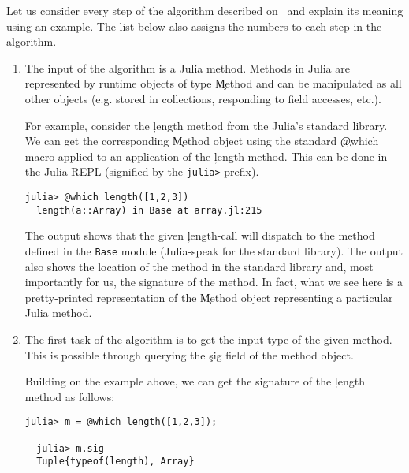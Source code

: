 Let us consider every step of the algorithm described
on~ and explain its meaning using an example.
The list below also assigns the numbers to each step in the algorithm.
\begin{enumerate}

  \item The input of the algorithm is a Julia method. Methods in Julia are
  represented by runtime objects of type \c{Method} and can be manipulated as
  all other objects (e.g. stored in collections, responding to field accesses, etc.).

  For example, consider the \c{length} method from the Julia's standard library. We can
  get the corresponding \c{Method} object using the standard \c{@which} macro
  applied to an application of the \c{length} method. This can be done in the
  Julia REPL (signified by the \texttt{julia>} prefix).

\begin{minipage}{.92\textwidth}
\begin{lstlisting}[style=jterm]
  julia> @which length([1,2,3])
  length(a::Array) in Base at array.jl:215
\end{lstlisting}
\end{minipage}

  The output shows that the given \c{length}-call will dispatch to the
  method defined in the \texttt{Base} module (Julia-speak for the standard
  library). The output also shows the location of the method in the
  standard library and, most importantly for us, the signature of the
  method. In fact, what we see here is a pretty-printed representation of
  the \c{Method} object representing a particular Julia method.

  \item The first task of the algorithm is to get the input type of the given
  method. This is possible through querying the \c{sig} field of the method object.

  Building on the example above, we can get the signature of the \c{length}
  method as follows:

\begin{minipage}{.92\textwidth}
\begin{lstlisting}[style=jterm]
  julia> m = @which length([1,2,3]);

  julia> m.sig
  Tuple{typeof(length), Array}
\end{lstlisting}
\end{minipage}


\end{enumerate}
